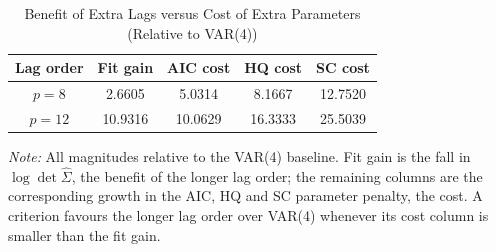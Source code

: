 \begin{table}[htpb]
    \centering
    \renewcommand{\arraystretch}{1.2}
    \caption{Benefit of Extra Lags versus Cost of Extra Parameters (Relative to VAR(4))}
    \label{tab:benefit_vs_cost}
    \begin{tabular}{ccccc}
    \toprule
    \textbf{Lag order} & \textbf{Fit gain} & \textbf{AIC cost} & \textbf{HQ cost} & \textbf{SC cost} \\
    \midrule
    $p = 8$ & 2.6605 & 5.0314 & 8.1667 & 12.7520 \\
    $p = 12$ & 10.9316 & 10.0629 & 16.3333 & 25.5039 \\
    \bottomrule
    \end{tabular}

    \vspace{0.2cm}
    \raggedright
    \scriptsize{\textit{Note:} All magnitudes relative to the VAR(4) baseline. Fit gain is the fall in $\log\det\hat{\Sigma}$, the benefit of the longer lag order; the remaining columns are the corresponding growth in the AIC, HQ and SC parameter penalty, the cost. A criterion favours the longer lag order over VAR(4) whenever its cost column is smaller than the fit gain.}
\end{table}
